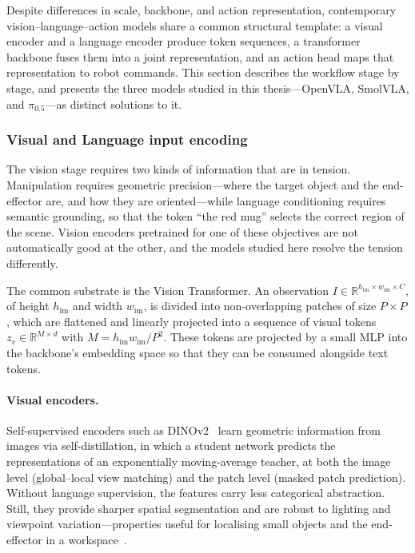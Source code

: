 \documentclass[english,12pt,a4paper,pdftex,elec,utf8]{aaltothesis}
\begin{document}
Despite differences in scale, backbone, and action representation, contemporary vision--language--action models share a common structural template: a visual encoder and a language encoder produce token sequences, a transformer backbone fuses them into a joint representation, and an action head maps that representation to robot commands. This section describes the workflow stage by stage, and presents the three models studied in this thesis---OpenVLA, SmolVLA, and $\pi_{0.5}$---as distinct solutions to it. 


\subsubsection{Visual and Language input encoding}
\label{subsubsec:vision}

The vision stage requires two kinds of information that are in tension.
Manipulation requires geometric precision---where the target object and the end-effector are, and how they are oriented---while language conditioning requires semantic grounding, so that the token ``the red mug'' selects the correct region of the scene. Vision encoders pretrained for one of these objectives are not automatically good at the other, and the models studied here resolve the tension differently.

The common substrate is the Vision Transformer. An observation $I \in \mathbb{R}^{h_{\mathrm{im}} \times w_{\mathrm{im}} \times C}$, of height $h_{\mathrm{im}}$ and width $w_{\mathrm{im}}$, is divided into non-overlapping patches of size $P \times P$, which are flattened and linearly projected into a sequence of visual tokens $z_v \in \mathbb{R}^{M \times d}$ with $M = h_{\mathrm{im}}w_{\mathrm{im}}/P^2$. These tokens are projected by a small MLP into the backbone's embedding space so that they can be consumed alongside text tokens.

\paragraph{Visual encoders.}
Self-supervised encoders such as DINOv2~\cite{oquab2024dinov2learningrobustvisual} learn geometric information from images via self-distillation, in which a student network predicts the representations of an exponentially moving-average teacher, at both the image level (global--local view matching) and the patch level (masked patch prediction). Without language supervision, the features carry less categorical abstraction. Still, they provide sharper spatial segmentation and are robust to lighting and viewpoint variation---properties useful for localising small objects and the end-effector in a  workspace~\cite{karamcheti2024prismatic}.
\end{document}
